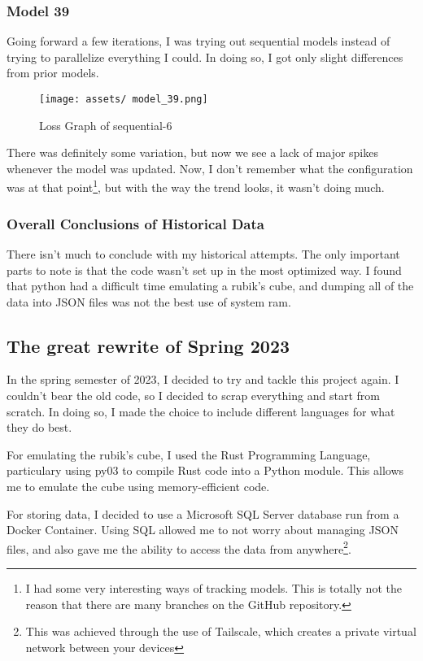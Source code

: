 \documentclass[12pt]{article}
\begin{document}
\subsubsection{Model 39}

Going forward a few iterations, I was trying out sequential models instead of trying to parallelize everything I could. In doing so, I got only slight differences from prior models.

\begin{figure}[h]
	\centering
	\texttt{[image: assets/ model\_39.png]}
	\caption{Loss Graph of sequential-6}
\end{figure}


There was definitely some variation, but now we see a lack of major spikes whenever the model was updated. Now, I don't remember what the configuration was at that point\footnote{I had some very interesting ways of tracking models. This is totally not the reason that there are many branches on the GitHub repository.}, but with the way the trend looks, it wasn't doing much.

\subsubsection{Overall Conclusions of Historical Data}

There isn't much to conclude with my historical attempts. The only important parts to note is that the code wasn't set up in the most optimized way. I found that python had a difficult time emulating a rubik's cube, and dumping all of the data into JSON files was not the best use of system ram.

\newpage

\subsection{The great rewrite of Spring 2023}

In the spring semester of 2023, I decided to try and tackle this project again. I couldn't bear the old code, so I decided to scrap everything and start from scratch. In doing so, I made the choice to include different languages for what they do best.

For emulating the rubik's cube, I used the Rust Programming Language, particulary using py03 to compile Rust code into a Python module. This allows me to emulate the cube using memory-efficient code.

For storing data, I decided to use a Microsoft SQL Server database run from a Docker Container. Using SQL allowed me to not worry about managing JSON files, and also gave me the ability to access the data from anywhere\footnote{This was achieved through the use of Tailscale, which creates a private virtual network between your devices}.
\end{document}
